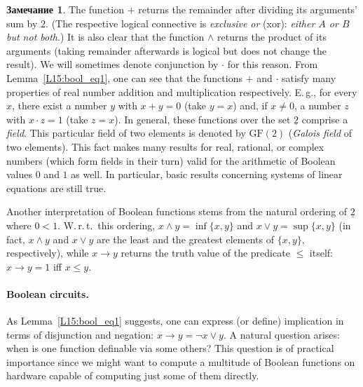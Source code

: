 \documentclass[12pt,notitlepage]{article}
\theoremstyle{plain}
\theoremstyle{definition}
\newtheorem{rem}[thm]{Замечание}
\theoremstyle{plain}
\newcommand{\ul}[1]{\underline{#1}}
\newcommand{\1}{\mathbf{1}}
\newcommand{\0}{\mathbf{0}}
\begin{document}
\begin{rem}\label{bool:ord_field}
	The function ${+}$ returns the remainder after dividing its arguments' sum by $2$. (The respective logical connective is \emph{exclusive or} (xor): \emph{either $A$ or $B$ but not both}.)
	It is also clear that the function ${\wedge}$ returns the product of its arguments (taking remainder afterwards is logical but does not change the result). We will sometimes denote conjunction by ${\cdot}$ for this reason. From Lemma~\ref{L15:bool_eq1}, one can see that the functions ${+}$ and ${\cdot}$ satisfy many properties of real number addition and multiplication respectively. E.\,g., for every $x$, there exist a number $y$ with $x + y = 0$ (take $y = x$) and, if $x\neq 0$, a number $z$ with $x \cdot z = 1$ (take $z = x$). In general, these functions over the set $\ul{2}$ comprise a \emph{field}. This particular field of two elements is denoted by $\mathrm{GF}(2)$ (\emph{Galois field} of two elements). This fact makes many results for real, rational, or complex numbers (which form fields in their turn) valid for the arithmetic of Boolean values $0$ and $1$ as well. In particular, basic results concerning systems of linear equations are still true.
	
	Another interpretation of Boolean functions stems from the natural ordering of $\ul{2}$ where $0 < 1$. W.\,r.\,t.\ this ordering, $x \wedge y = \inf \{x, y\}$ and $x \vee y = \sup \{x, y\}$ (in fact, $x \wedge y$ and $x \vee y$ are the least and the greatest elements of $\{x,y\}$, respectively), while $x \to y$ returns the truth value of the predicate ${\leq}$ itself: $x \to y = 1$ iff $x \leq y$.
\end{rem}


\paragraph{Boolean circuits.} As Lemma~\ref{L15:bool_eq1} suggests, one can express (or define) implication in terms of disjunction and negation: $x \to y = \neg x \vee y$. A natural question arises: when is one function  definable via some others? This question is of practical importance since we might want to compute a multitude of Boolean functions on hardware  capable of computing just some of them directly.
\end{document}
